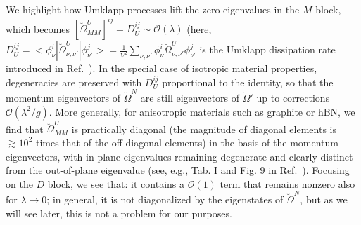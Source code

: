 \documentclass[
prb,
twocolumn,
superscriptaddress,
 amsmath,amssymb,
 aps,
longbibliography,
]{revtex4-2}
\begin{document}
We highlight how
Umklapp processes lift the zero eigenvalues in
the $M$ block, which becomes $[\breve{\Omega}^{U}_{MM}]^{ij}=D_U^{ij}\sim\mathcal{O(\lambda)}$ (here,
$D^{ij}_U=\big<\phi^i_\nu|\breve{\Omega}^{U}_{\nu,\nu'}|\phi^j_{\nu'}\big>=\frac{1}{V^2}\sum_{\nu,\nu'} \phi^i_\nu \breve{\Omega}^{U}_{\nu,\nu'} \phi^j_{\nu'}$
is the Umklapp dissipation rate introduced in Ref.~\cite{Simoncelli2020}). In the special case of isotropic material properties, degeneracies are preserved with $D_U^{ij}$ proportional to the identity, so that the momentum eigenvectors of $\breve{\Omega}^{N}$ are still eigenvectors of $\breve{\Omega}'$ up to corrections $\mathcal{O}(\lambda^2/g)$.
More generally, for anisotropic materials such as graphite or hBN, we find that $\breve{\Omega}^{U}_{MM}$ is practically diagonal (the magnitude of diagonal elements is $\gtrsim 10^2$ times that of the off-diagonal elements) in the basis of the momentum eigenvectors, with in-plane eigenvalues remaining degenerate and clearly distinct from the out-of-plane eigenvalue (see, e.g., Tab. I and Fig. 9 in Ref.~\cite{Simoncelli2020}).
Focusing on the $D$ block, we see that: it contains a $\mathcal{O}(1)$ term that remains nonzero also for $\lambda\to 0$; in general, it is not diagonalized by the eigenstates of $\breve{\Omega}^{N}$, but as we will see later, this is not a problem for our purposes.
\end{document}
